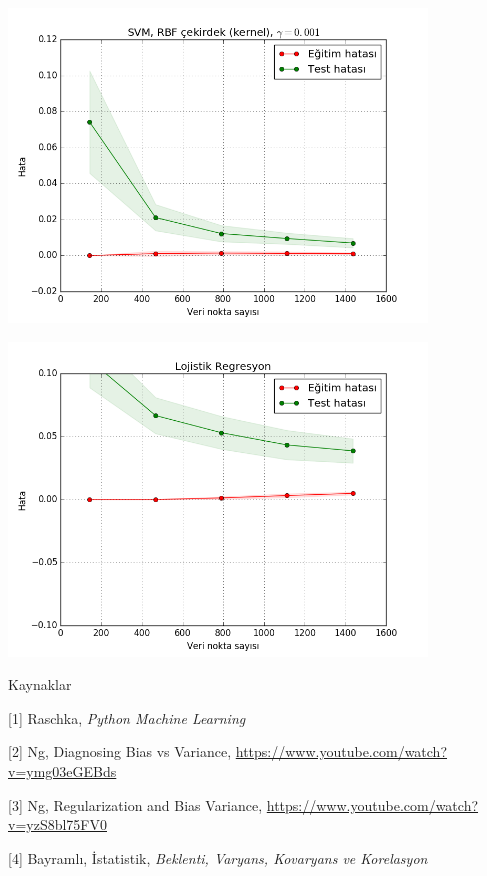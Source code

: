 \documentclass[12pt,fleqn]{article}\usepackage{../../common}
\begin{document}
\includegraphics[width=30em]{modeval_03.png}

\includegraphics[width=30em]{modeval_04.png}


Kaynaklar

[1] Raschka, {\em Python Machine Learning}

[2] Ng, Diagnosing Bias vs Variance, \url{https://www.youtube.com/watch?v=ymg03eGEBds}

[3] Ng, Regularization and Bias Variance, \url{https://www.youtube.com/watch?v=yzS8bl75FV0}

[4] Bayramlı, İstatistik, {\em Beklenti, Varyans, Kovaryans ve Korelasyon}
\end{document}
